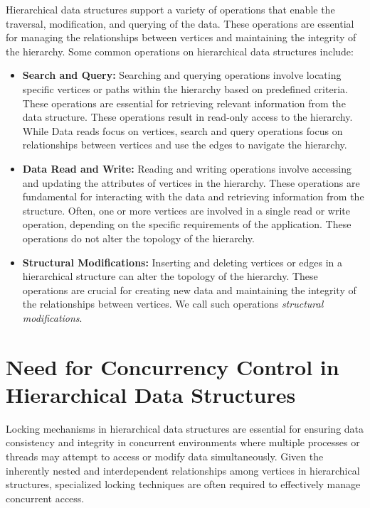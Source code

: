 Hierarchical data structures support a variety of operations that enable the traversal, modification, and querying of the data. These operations are essential for managing the relationships between vertices and maintaining the integrity of the hierarchy. Some common operations on hierarchical data structures include:

\begin{itemize}

    \item \textbf{Search and Query:} Searching and querying operations involve locating specific vertices or paths within the hierarchy based on predefined criteria. These operations are essential for retrieving relevant information from the data structure. These operations result in read-only access to the hierarchy. While Data reads focus on vertices, search and query operations focus on relationships between vertices and use the edges to navigate the hierarchy.
    
    \item \textbf{Data Read and Write:} Reading and writing operations involve accessing and updating the attributes of vertices in the hierarchy. These operations are fundamental for interacting with the data and retrieving information from the structure. Often, one or more vertices are involved in a single read or write operation, depending on the specific requirements of the application. These operations do not alter the topology of the hierarchy.

    \item \textbf{Structural Modifications:} Inserting and deleting vertices or edges in a hierarchical structure can alter the topology of the hierarchy. These operations are crucial for creating new data and maintaining the integrity of the relationships between vertices. We call such operations \emph{structural modifications}.
    

\end{itemize}


\section{Need for Concurrency Control in Hierarchical Data Structures} \label{sec:multicoresystemsandconcurrencycontrol}
Locking mechanisms in hierarchical data structures are essential for ensuring data consistency and integrity in concurrent environments where multiple processes or threads may attempt to access or modify data simultaneously. Given the inherently nested and interdependent relationships among vertices in hierarchical structures, specialized locking techniques are often required to effectively manage concurrent access.

